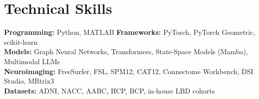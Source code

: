 \documentclass[11pt]{article}
\begin{document}
\section{Technical Skills}
\textbf{Programming:} Python, MATLAB \quad \textbf{Frameworks:} PyTorch, PyTorch Geometric, scikit-learn \\
\textbf{Models:} Graph Neural Networks, Transformers, State-Space Models (Mamba), Multimodal LLMs \\
\textbf{Neuroimaging:} FreeSurfer, FSL, SPM12, CAT12, Connectome Workbench, DSI Studio, MRtrix3 \\
\textbf{Datasets:} ADNI, NACC, AABC, HCP, BCP, in-house LBD cohorts
\end{document}
